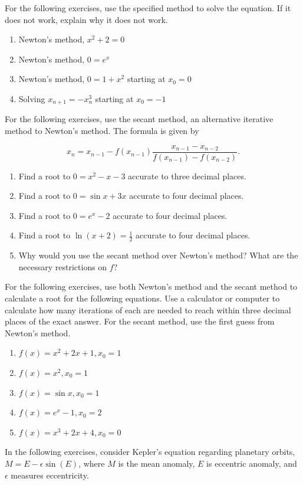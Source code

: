 \documentclass{exercises}
\begin{document}
For the following exercises, use the specified method to solve the equation. If it does not work, explain why it does not work.

\begin{enumerate}[resume]
\item Newton's method, $x^{2}+2=0$
\item Newton's method, $0=e^{x}$
\item Newton's method, $0=1+x^{2}$ starting at $x_{0}=0$
\item Solving $x_{n+1}=-x_{n}^{3}$ starting at $x_{0}=-1$
\end{enumerate}

For the following exercises, use the secant method, an alternative iterative method to Newton's method. The formula is given by


\[x_{n}=x_{n-1}-f(x_{n-1})\frac{x_{n-1}-x_{n-2}}{f(x_{n-1})-f(x_{n-2})}.\]

\begin{enumerate}[resume]
\item Find a root to $0=x^{2}-x-3$ accurate to three decimal places.
\item Find a root to $0=\sin x+3x$ accurate to four decimal places.
\item Find a root to $0=e^{x}-2$ accurate to four decimal places.
\item Find a root to $\ln(x+2)=\frac{1}{2}$ accurate to four decimal places.
\item Why would you use the secant method over Newton's method? What are the necessary restrictions on $f$?
\end{enumerate}

For the following exercises, use both Newton's method and the secant method to calculate a root for the following equations. Use a calculator or computer to calculate how many iterations of each are needed to reach within three decimal places of the exact answer. For the secant method, use the first guess from Newton's method.

\begin{enumerate}[resume]
\item $f(x)=x^{2}+2x+1,x_{0}=1$
\item $f(x)=x^{2},x_{0}=1$
\item $f(x)=\sin x,x_{0}=1$
\item $f(x)=e^{x}-1,x_{0}=2$
\item $f(x)=x^{3}+2x+4,x_{0}=0$
\end{enumerate}

In the following exercises, consider Kepler's equation regarding planetary orbits, $M=E-\epsilon \sin(E)$, where $M$ is the mean anomaly, $E$ is eccentric anomaly, and $\epsilon$ measures eccentricity.
\end{document}
